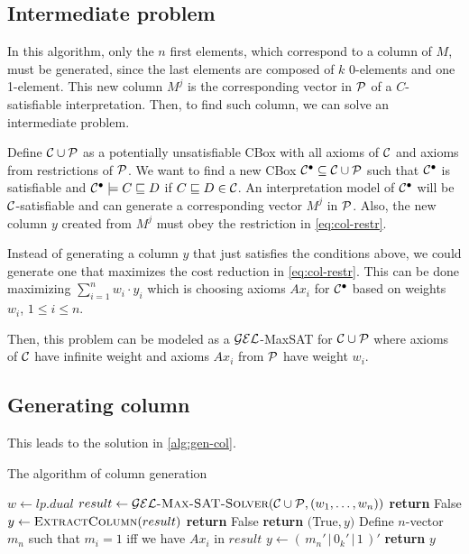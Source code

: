 \subsection{Intermediate problem}

In this algorithm, only the $n$ first elements, which correspond to a column of $M$, must be generated, since the last elements are composed of $k$ 0-elements and one 1-element. This new column $M^j$ is the corresponding vector in $\mathcal{P}$ of a $C$-satisfiable interpretation. Then, to find such column, we can solve an intermediate problem.

Define $\mathcal{C} \cup \mathcal{P}$ as a potentially unsatisfiable CBox with all axioms of $\mathcal{C}$ and axioms from restrictions of $\mathcal{P}$. We want to find a new CBox $\mathcal{C}^\bullet \subseteq \mathcal{C} \cup \mathcal{P}$ such that $\mathcal{C}^\bullet$ is satisfiable and $\mathcal{C}^\bullet \models C \sqsubseteq D$ if $C \sqsubseteq D \in \mathcal{C}$. An interpretation model of $\mathcal{C}^\bullet$ will be $\mathcal{C}$-satisfiable and can generate a corresponding vector $M^j$ in $\mathcal{P}$. Also, the new column $y$ created from $M^j$ must obey the restriction in \autoref{eq:col-restr}.

Instead of generating a column $y$ that just satisfies the conditions above, we could generate one that maximizes the cost reduction in \autoref{eq:col-restr}. This can be done maximizing $\sum_{i = 1}^n w_i \cdot y_i$ which is choosing axioms $Ax_i$ for $\mathcal{C}^\bullet$ based on weights $w_i$, $1 \leq i \leq n$.

Then, this problem can be modeled as a $\mathcal{GEL}$-MaxSAT for $\mathcal{C} \cup \mathcal{P}$ where axioms of $\mathcal{C}$ have infinite weight and axioms $Ax_i$ from $\mathcal{P}$ have weight $w_i$. 

\subsection{Generating column}

This leads to the solution in \autoref{alg:gen-col}.

\begin{algorithm}
	\caption{The algorithm of column generation}
	\label{alg:gen-col}
	\begin{algorithmic}[1]
		\State $w \gets lp.dual$
		\State $result \gets \Call{$\gel$-Max-SAT-Solver}{\CC \cup \PP, (w_1, \dots, w_n)}$
		\State \textbf{return} False
		\EndIf
		\Statex
		\State $y \gets \Call{ExtractColumn}{result}$
		\State \textbf{return} False
		\EndIf
		\Statex
		\State \textbf{return} $($True$, y)$
		\EndFunction
		\Statex
		\State Define $n$-vector $m_n$ such that $m_i = 1$ iff we have $Ax_i$ in $result$
		\State $y \gets (\, m_n' \, | \, 0_k' \, |\, 1 \,)'$
		\State \textbf{return} $y$
		\EndFunction
	\end{algorithmic}
\end{algorithm}


